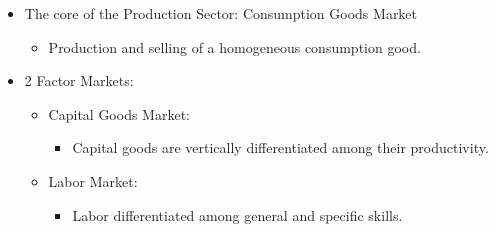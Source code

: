 \documentclass{beamer}
\begin{document}
{\begin{itemize}
	\item The core of the Production Sector: Consumption Goods Market
	
\begin{itemize}
	\item Production and selling of a homogeneous consumption good.

\end{itemize}

	\item 2 Factor Markets:
	
\begin{itemize}
	\item Capital Goods Market: 
	
\begin{itemize}
	\item Capital goods are vertically differentiated among their productivity.
\end{itemize}

\item Labor Market:
\begin{itemize}
	\item Labor differentiated among general and specific skills.
\end{itemize}
\end{itemize}


\end{itemize}
}
\end{document}
